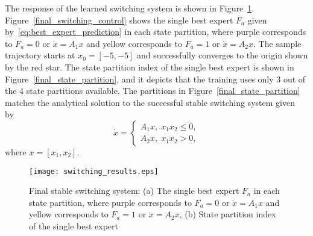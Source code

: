 The response of the learned switching system is shown in
Figure~\ref{fig:final_switching}.
%
Figure~\ref{final_switching_control} shows the single best expert $F_a$
given by~\eqref{eq:best_expert_prediction} in each state partition, where purple
corresponds to $F_a=0$ or $\dot{x} = A_1x$ and yellow corresponds to $F_a=1$ or
$\dot{x} = A_2x$. The sample trajectory starts at $x_0=[-5, -5]$ and
successfully converges to the origin shown by the red star.
%
The state partition index of the single best expert is shown in
Figure~\ref{final_state_partition}, and it depicts that the training uses only 3
out of the 4 state partitions available.
%
The partitions in Figure~\ref{final_state_partition} matches the analytical
solution to the successful stable switching system given
by~\cite{liberzon2003switching}
\begin{equation*}
    \dot{x} = \begin{cases}
        A_1x, \; x_1x_2 \leq 0, \\
        A_2x, \; x_1x_2 > 0,
    \end{cases}
\end{equation*}
\noindent where $x=[x_1, x_2]$.
%
\begin{figure}[tb]
    \centering
    \texttt{[image: switching\_results.eps]}
    \subfloat[\label{final_switching_control}]{\hspace{0.55\linewidth}} \subfloat[\label{final_state_partition}]{\hspace{0.4\linewidth}}
    \caption{Final stable switching system: (a) The single best expert $F_a$ in
    each state partition, where purple corresponds to $F_a=0$ or $\dot{x} =
    A_1x$ and yellow corresponds to $F_a=1$ or $\dot{x} = A_2x$, (b) State
    partition index of the single best expert}
    \label{fig:final_switching}
\end{figure}

